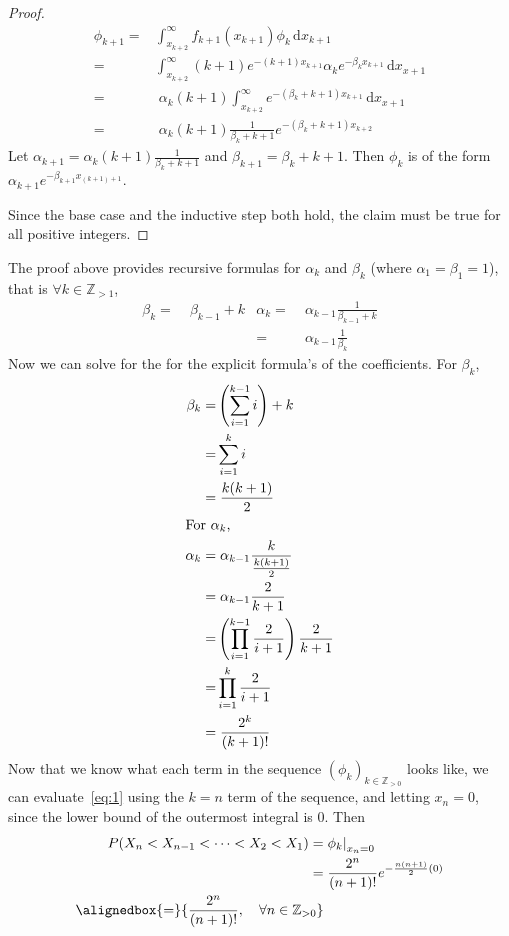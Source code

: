 \documentclass{mthe353answer}
\begin{document}
\begin{questions}
\begin{proof}
    \begin{align*}
      \phi_{k+1} =& \int_{x_{k+2}}^{\infty} f_{k+1}(x_{k+1}) \phi_k \, \mathrm{d}x_{k+1}\\
      =& \int_{x_{k+2}}^{\infty} (k+1)e^{-(k+1)x_{k+1}} \alpha_k e^{-\beta_k x_{k+1}} \, \mathrm{d}x_{x+1}\\
      =&\; \alpha_k (k+1) \int_{x_{k+2}}^{\infty} e^{-(\beta_k+k+1)x_{k+1}} \, \mathrm{d}x_{x+1}\\
      =&\; \alpha_k (k+1) \frac{1}{\beta_k+k+1} e^{-(\beta_k+k+1)x_{k+2}}
    \end{align*}
    Let \(\alpha_{k+1}=\alpha_k (k+1) \frac{1}{\beta_k+k+1}\) and 
    \(\beta_{k+1}=\beta_k+k+1\). Then \(\phi_k\) is of the form 
    \(\alpha_{k+1}e^{-\beta_{k+1}x_{(k+1)+1}}\).

    Since the base case and the inductive step both hold, the claim must be true
    for all positive integers.
  \end{proof}
  The proof above provides recursive formulas for \(\alpha_k\) and \(\beta_k\)
  (where \(\alpha_1 = \beta_1 = 1\)), that is \(\forall k \in \mathbb{Z}_{>1}\),
  \begin{align*}
    \beta_k =&\; \beta_{k-1} + k & \alpha_k =&\; \alpha_{k-1} \frac{1}{\beta_{k-1} + k}\\
             &                    &          =&\; \alpha_{k-1} \frac{1}{\beta_k}
  \end{align*}
  Now we can solve for the for the explicit formula's of the coefficients. For \(\beta_k\),
  \begin{align*}
    \beta_k =& \left(\sum_{i=1}^{k-1}i\right)+k\\
    =& \sum_{i=1}^{k}i\\
    =&\; \frac{k(k+1)}{2}\\
    \intertext{For \(\alpha_k\),}
    \alpha_k =&\; \alpha_{k-1}\frac{k}{\frac{k(k+1)}{2}}\\
    =&\; \alpha_{k-1} \frac{2}{k+1}\\
    =&\left(\prod_{i=1}^{k-1}\frac{2}{i+1}\right)\frac{2}{k+1}\\
    =& \prod_{i=1}^{k} \frac{2}{i+1}\\
    =&\; \frac{2^k}{(k+1)!}
  \end{align*}
  Now that we know what each term in the sequence \((\phi_k)_{k \in \mathbb{Z}_{>0}}\)
  looks like, we can evaluate~\eqref{eq:1} using the \(k = n\)
  term of the sequence, and letting \(x_n = 0\), since the lower bound of the
  outermost integral is 0. Then
  \begin{align*}
    P(X_n<X_{n-1}<\cdots<X_2<X_1) =& \left.\phi_{k}\right|_{x_n=0}\\
    =&\; \frac{2^{n}}{(n+1)!} e^{-\frac{n(n+1)}{2}(0)}\\
    \alignedbox{=}{\frac{2^{n}}{(n+1)!},\quad \forall n \in \mathbb{Z}_{>0}}
  \end{align*}
\end{questions}
\end{document}
